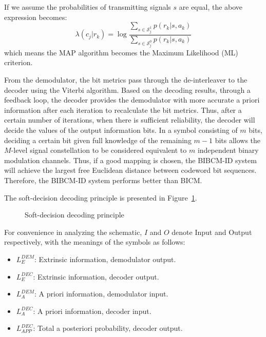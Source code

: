 \documentclass[a4paper,14pt]{extreport}
\begin{document}
If we assume the probabilities of transmitting signals $s$ are equal, the above expression becomes:
\begin{equation}
    \lambda(c_j | r_k) = \log\frac{\sum_{s \in \mathcal{S}_j^1} p(r_k|s, a_k)}{\sum_{s \in \mathcal{S}_j^0} p(r_k|s, a_k)}
    \label{eq:ml_metric}
\end{equation}
which means the MAP algorithm becomes the Maximum Likelihood (ML) criterion.

From the demodulator, the bit metrics pass through the de-interleaver to the decoder using the Viterbi algorithm. Based on the decoding results, through a feedback loop, the decoder provides the demodulator with more accurate a priori information after each iteration to recalculate the bit metrics. Thus, after a certain number of iterations, when there is sufficient reliability, the decoder will decide the values of the output information bits. In a symbol consisting of $m$ bits, deciding a certain bit given full knowledge of the remaining $m-1$ bits allows the $M$-level signal constellation to be considered equivalent to $m$ independent binary modulation channels. Thus, if a good mapping is chosen, the BIBCM-ID system will achieve the largest free Euclidean distance between codeword bit sequences. Therefore, the BIBCM-ID system performs better than BICM.

The soft-decision decoding principle is presented in Figure~\ref{fig:soft_decision}.

\begin{figure}[H]
    \centering
    \caption{Soft-decision decoding principle}
    \label{fig:soft_decision}
\end{figure}

For convenience in analyzing the schematic, $I$ and $O$ denote Input and Output respectively, with the meanings of the symbols as follows:
\begin{itemize}
    \item $L_E^{DEM}$: Extrinsic information, demodulator output.
    \item $L_E^{DEC}$: Extrinsic information, decoder output.
    \item $L_A^{DEM}$: A priori information, demodulator input.
    \item $L_A^{DEC}$: A priori information, decoder input.
    \item $L_{APP}^{DEC}$: Total a posteriori probability, decoder output.
\end{itemize}
\end{document}
